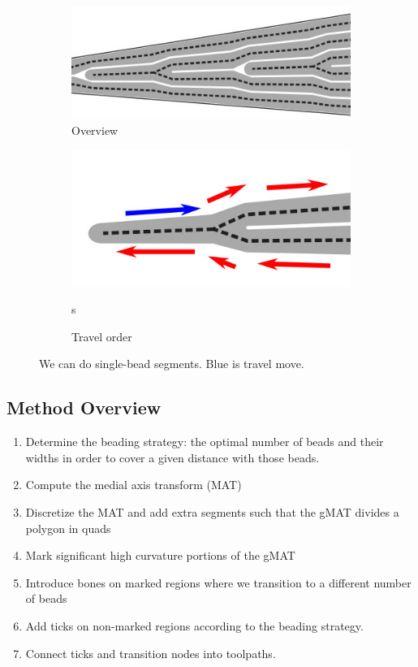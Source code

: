\begin{figure}
\begin{subfigure}{0.45\columnwidth}
\includegraphics[width=\columnwidth]{sources/method/single_bead_strategy.jpg}
\caption{Overview}
\label{single_bead_strategy_overview}
\end{subfigure}
\begin{subfigure}{0.45\columnwidth}
\includegraphics[width=\columnwidth]{sources/method/single_bead_strategy_order.jpg}
\caption{Travel order}s
\end{subfigure}
\caption{We can do single-bead segments. Blue is travel move.}
\label{single_bead_strategy}
\end{figure}

\subsection{Method Overview}
\begin{enumerate}
\item Determine the beading strategy: the optimal number of beads and their widths in order to cover a given distance with those beads.
\item Compute the medial axis transform (MAT)
\item Discretize the MAT and add extra segments such that the gMAT divides a polygon in quads
\item Mark significant high curvature portions of the gMAT
\item Introduce bones on marked regions where we transition to a different number of beads
\item Add ticks on non-marked regions according to the beading strategy.
\item Connect ticks and transition nodes into toolpaths.
\end{enumerate}



